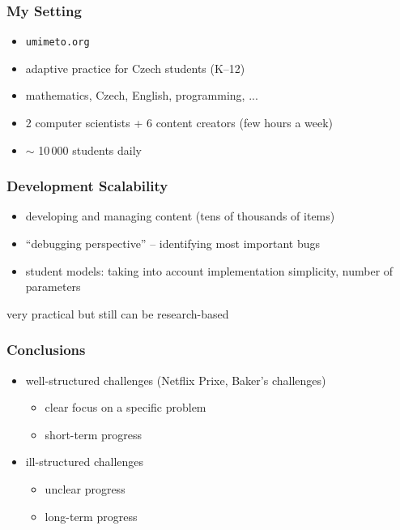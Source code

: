 \documentclass[bigger]{beamer}
\begin{document}
\begin{frame}
  \frametitle{My Setting}

  \begin{itemize}
  \item \texttt{umimeto.org}
  \item adaptive practice for Czech students (K--12)
  \item mathematics, Czech, English, programming, ...
  \item 2 computer scientists + 6 content creators (few hours a week)
  \item $\sim$ 10\,000 students daily
  \end{itemize}
\end{frame}

\begin{frame}
  \frametitle{Development Scalability}

  \begin{itemize}
  \item developing and managing content (tens of thousands of items)
  \item ``debugging perspective'' -- identifying most important bugs
  \item student models: taking into account implementation simplicity, number
    of parameters
  \end{itemize}

  very practical but still can be research-based
\end{frame}

\begin{frame}
  \frametitle{Conclusions}

  \begin{itemize}
  \item well-structured challenges (Netflix Prixe, Baker's challenges)
    \begin{itemize}
    \item clear focus on a specific problem
    \item short-term progress
    \end{itemize}
  \item ill-structured challenges
    \begin{itemize}
    \item unclear progress
    \item long-term progress
    \end{itemize}
  \end{itemize}
\end{frame}
\end{document}
